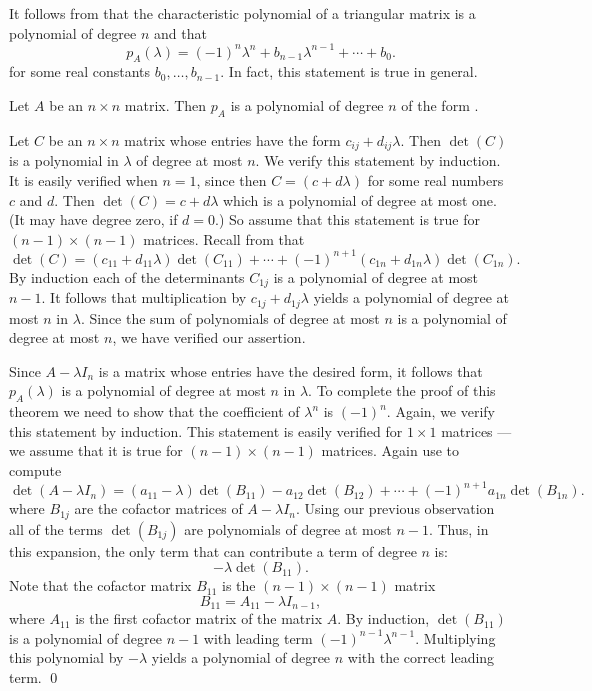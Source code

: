 It follows from  that the characteristic
polynomial of a triangular matrix
is a polynomial of degree $n$ and that
\begin{equation}  \label{e:leadingterm}
p_A(\lambda) = (-1)^n \lambda^n + b_{n-1}\lambda^{n-1} + \cdots +b_0.
\end{equation}
for some real constants $b_0, \ldots, b_{n-1}$. In fact, this
statement is true in general.  

\begin{thm}  \label{T:charpolyn}
Let $A$ be an $n\times n$ matrix.  Then $p_A$ is a polynomial of
degree $n$ of the form .
\end{thm} 

\proof Let $C$ be an $n\times n$ matrix whose entries have
the form $c_{ij}+d_{ij}\lambda$.  Then $\det(C)$ is a polynomial
in $\lambda$ of degree at most $n$.  We verify this statement by
induction. It is easily verified when $n=1$, since then
$C=(c+d\lambda)$ for some real numbers $c$ and $d$. Then
$\det(C)=c+d\lambda$ which is a polynomial of degree at most
one.  (It may have degree zero, if $d=0$.) So assume that this
statement is true for $(n-1)\times (n-1)$ matrices. Recall from
 that 
\[
\det(C) = (c_{11}+d_{11}\lambda)\det(C_{11})
+\cdots+(-1)^{n+1}(c_{1n}+d_{1n}\lambda)\det(C_{1n}).
\]    
By induction each of the determinants $C_{1j}$ is a polynomial
of degree at most $n-1$.  It follows that multiplication by
$c_{1j}+d_{1j}\lambda$ yields a polynomial of degree at most $n$
in $\lambda$.  Since the sum of polynomials of degree at most
$n$ is a polynomial of degree at most $n$, we have verified our
assertion.

Since $A-\lambda I_n$ is a matrix whose entries have the
desired form, it follows that $p_A(\lambda)$ is a polynomial of
degree at most $n$ in $\lambda$.  To complete the proof of this
theorem we need to show that the coefficient of $\lambda^n$ is
$(-1)^n$.  Again, we verify this statement by induction.  This
statement is easily verified for $1\times 1$ matrices --- we
assume that it is true for $(n-1)\times (n-1)$ matrices.  Again
use  to compute
\[
\det(A-\lambda I_n) = (a_{11}-\lambda)\det(B_{11})-a_{12}\det(B_{12}) 
+\cdots+(-1)^{n+1}a_{1n}\det(B_{1n}).
\]
where $B_{1j}$ are the cofactor  matrices of
$A-\lambda I_n$.  Using our previous observation all of the
terms $\det(B_{1j})$ are polynomials of degree at most $n-1$.
Thus, in this expansion, the only term that can contribute a
term of degree $n$ is:
\[
-\lambda\det(B_{11}).
\]
Note that the cofactor matrix $B_{11}$ is the $(n-1)\times
(n-1)$ matrix
\[
B_{11} = A_{11} -\lambda I_{n-1},
\]
where $A_{11}$ is the first cofactor matrix of the matrix $A$.
By induction, $\det(B_{11})$ is a polynomial of degree $n-1$ with
leading term $(-1)^{n-1}\lambda^{n-1}$.  Multiplying this
polynomial by $-\lambda$ yields a polynomial of degree $n$ with
the correct leading term.  \qed

